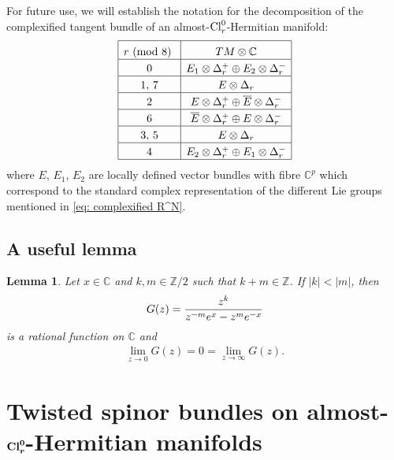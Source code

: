 \documentclass[10pt,a4paper]{amsart}
\newcommand\tstrut{\rule{0pt}{2.6ex}}
\numberwithin{equation}{section}
\newtheorem{Lemma}[Theorem]{Lemma}
 { \theoremstyle{definition}
\newtheorem{Definition}[Theorem]{Definition}
\newtheorem{Example}[Theorem]{Example}
\newtheorem{Remark}[Theorem]{Remark} }
\begin{document}
For future use, we will establish the notation for the decomposition of the complexif\/ied tangent bundle of an almost-${\rm Cl}_r^0$-Hermitian manifold:
\begin{gather}
\begin{array}{|c|c|}
 \hline
 r \mbox{\ {\rm (mod 8)} } &TM\otimes \mathbb{C}
\rule{0pt}{3ex}\\
\hline
 0 & E_1\otimes \Delta_r^+ \oplus E_2\otimes \Delta_r^-\tstrut\\
 \hline
 1,\, 7 & E\otimes \Delta_r\tstrut\\
\hline
 2 & E\otimes \Delta_r^+\oplus\overline{E}\otimes\Delta_r^-\tstrut\\
\hline
 6 & \overline{E}\otimes \Delta_r^+\oplus E\otimes\Delta_r^-\tstrut\\
\hline
 3,\, 5 & E\otimes \Delta_r\tstrut\\
\hline
 4 & E_2\otimes \Delta_r^+ \oplus E_1\otimes \Delta_r^-\tstrut\\
\hline
 \end{array} \label{eq: complexified tangent space}
\end{gather}
where $E$, $E_1$, $E_2$ are locally def\/ined vector bundles with f\/ibre $\mathbb{C}^p$ which correspond to the standard complex representation
of the dif\/ferent Lie groups mentioned in %
\eqref{eq: complexified R^N}.

\subsection{A useful lemma}

\begin{Lemma}\label{lemma: useful lemma}
Let $x\in \mathbb{C}$ and $k,m\in \mathbb{Z}/2$ such that $k+m\in \mathbb{Z}$. If $|k|<|m|$, then
\begin{gather*}G(z)={z^{k}\over z^{-m}e^{x} - z^{m}e^{-x}}\end{gather*}
 is a rational function on $\mathbb{C}$ and
\begin{gather*}\lim_{z\rightarrow 0 } G(z) = 0 = \lim_{z\rightarrow \infty } G(z).\end{gather*}
\end{Lemma}

\section[Twisted spinor bundles on almost-${\rm Cl}_r^0$-Hermitian manifolds]{Twisted spinor bundles on almost-$\boldsymbol{{\rm Cl}_r^0}$-Hermitian manifolds}\label{sec: twisted spinor bundles}
\end{document}
